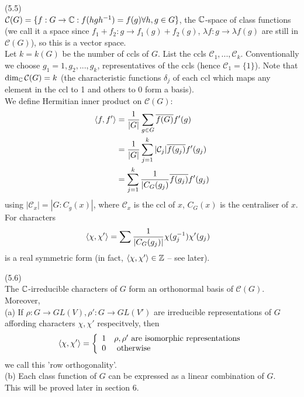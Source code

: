 \documentclass[a4paper]{article}
\begin{document}
\begin{defi} (5.5)\\
$\mathcal{C}(G) = \{f: G \to \mathbb{C}: f(hgh^{-1}) = f(g) \forall h,g \in G\}$, the $\mathbb{C}$-space of class functions (we call it a space since $f_1+f_2: g \to f_1(g)+f_2(g)$, $\lambda f: g \to \lambda f(g)$ are still in $\mathcal{C}(G)$), so this is a vector space.\\
Let $k = k(G)$ be the number of ccls of $G$. List the ccls $\mathcal{C}_1,...,\mathcal{C}_k$. Conventionally we choose $g_1 = 1, g_2,...,g_k$, representatives of the ccls (hence $\mathcal{C}_1 = \{1\}$). Note that $\dim_{\mathbb{C}} \mathcal{C}(G) = k$ (the characteristic functions $\delta_j$ of each ccl which maps any element in the ccl to 1 and others to 0 form a basis).\\
We define Hermitian inner product on $\mathcal{C}(G)$:
\begin{equation*}
\begin{aligned}
\langle f,f' \rangle &= \frac{1}{|G|} \sum_{g \in G} \overline{f(G)} f'(g)\\
&= \frac{1}{|G|} \sum_{j=1}^k |\mathcal{C}_j| \overline{f(g_j)} f'(g_j)\\
&= \sum_{j=1}^k \frac{1}{|C_G(g_j)} \overline{f(g_j)} f'(g_j)
\end{aligned}
\end{equation*}
using $|\mathcal{C}_x| =  |G:C_g(x)|$, where $\mathcal{C}_x$ is the ccl of $x$, $C_G(x)$ is the centraliser of $x$.\\
For characters
\begin{equation*}
\begin{aligned}
\langle \chi,\chi' \rangle &= \sum \frac{1}{|C_G(g_j)|} \chi(g_j^{-1}) \chi'(g_j)
\end{aligned}
\end{equation*}
is a real symmetric form (in fact, $\langle \chi,\chi'\rangle \in \mathbb{Z}$ -- see later).
\end{defi}

\begin{thm} (5.6)\\
The $\mathbb{C}$-irreducible characters of $G$ form an orthonormal basis of $\mathcal{C}(G)$. Moreover,\\
(a) If $\rho:G \to GL(V), \rho': G \to GL(V')$ are irreducible representations of $G$ affording characters $\chi,\chi'$ respecitvely, then
\begin{equation*}
\begin{aligned}
\langle \chi,\chi' \rangle = \left\{\begin{array}{ll}
1 & \rho,\rho' \text{ are isomorphic representations}\\
0 & \text{ otherwise}
\end{array}
\right.
\end{aligned}
\end{equation*}
we call this 'row orthogonality'.\\
(b) Each class function of $G$ can be expressed as a linear combination of $G$.\\
This will be proved later in section 6.
\end{thm}
\end{document}

